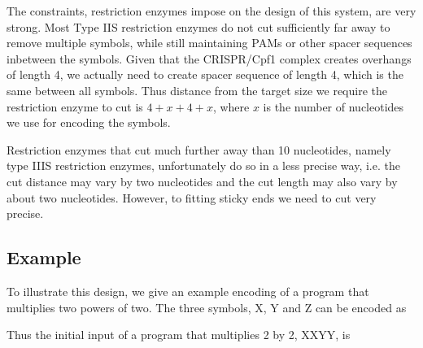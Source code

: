 \documentclass[
11pt, %
a4paper, %
oneside, %
headinclude,footinclude, %
BCOR5mm, %
]{scrartcl}
\begin{document}
The constraints, restriction enzymes impose on the design of this system, are
very strong.
Most Type IIS restriction enzymes do not cut sufficiently far away to remove
multiple symbols, while still maintaining PAMs or other spacer sequences
inbetween the symbols.
Given that the CRISPR/Cpf1 complex creates overhangs of length 4, we actually
need to create spacer sequence of length 4, which is the same between all
symbols.
Thus distance from the target size we require the restriction enzyme to cut is
$4 + x + 4 + x$, where $x$ is the number of nucleotides we use for encoding the
symbols.

Restriction enzymes that cut much further away than 10 nucleotides, namely type
IIIS restriction enzymes, unfortunately do so in a less precise way, i.e. the
cut distance may vary by two nucleotides and the cut length may also vary by
about two nucleotides.
However, to fitting sticky ends we need to cut very precise.

\subsection{Example}
To illustrate this design, we give an example encoding of a program that
multiplies two powers of two.
The three symbols, X, Y and Z can be encoded as

\begin{center}
\end{center}
Thus the initial input of a program that multiplies 2 by 2, XXYY, is
\end{document}
